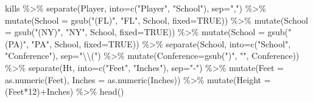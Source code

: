 \documentclass[
]{book}
\newenvironment{Shaded}{\begin{snugshade}}{\end{snugshade}}
\newcommand{\AttributeTok}[1]{\textcolor[rgb]{0.77,0.63,0.00}{#1}}
\newcommand{\ConstantTok}[1]{\textcolor[rgb]{0.00,0.00,0.00}{#1}}
\newcommand{\DecValTok}[1]{\textcolor[rgb]{0.00,0.00,0.81}{#1}}
\newcommand{\FunctionTok}[1]{\textcolor[rgb]{0.00,0.00,0.00}{#1}}
\newcommand{\NormalTok}[1]{#1}
\newcommand{\SpecialCharTok}[1]{\textcolor[rgb]{0.00,0.00,0.00}{#1}}
\newcommand{\StringTok}[1]{\textcolor[rgb]{0.31,0.60,0.02}{#1}}
\begin{document}
\begin{Shaded}
\begin{Highlighting}[]
\NormalTok{kills }\SpecialCharTok{\%\textgreater{}\%} 
  \FunctionTok{separate}\NormalTok{(Player, }\AttributeTok{into=}\FunctionTok{c}\NormalTok{(}\StringTok{"Player"}\NormalTok{, }\StringTok{"School"}\NormalTok{), }\AttributeTok{sep=}\StringTok{","}\NormalTok{) }\SpecialCharTok{\%\textgreater{}\%} 
  \FunctionTok{mutate}\NormalTok{(}\AttributeTok{School =} \FunctionTok{gsub}\NormalTok{(}\StringTok{"(FL)"}\NormalTok{, }\StringTok{"FL"}\NormalTok{, School, }\AttributeTok{fixed=}\ConstantTok{TRUE}\NormalTok{)) }\SpecialCharTok{\%\textgreater{}\%}
  \FunctionTok{mutate}\NormalTok{(}\AttributeTok{School =} \FunctionTok{gsub}\NormalTok{(}\StringTok{"(NY)"}\NormalTok{, }\StringTok{"NY"}\NormalTok{, School, }\AttributeTok{fixed=}\ConstantTok{TRUE}\NormalTok{)) }\SpecialCharTok{\%\textgreater{}\%}
  \FunctionTok{mutate}\NormalTok{(}\AttributeTok{School =} \FunctionTok{gsub}\NormalTok{(}\StringTok{"(PA)"}\NormalTok{, }\StringTok{"PA"}\NormalTok{, School, }\AttributeTok{fixed=}\ConstantTok{TRUE}\NormalTok{)) }\SpecialCharTok{\%\textgreater{}\%}
  \FunctionTok{separate}\NormalTok{(School, }\AttributeTok{into=}\FunctionTok{c}\NormalTok{(}\StringTok{"School"}\NormalTok{, }\StringTok{"Conference"}\NormalTok{), }\AttributeTok{sep=}\StringTok{"}\SpecialCharTok{\textbackslash{}\textbackslash{}}\StringTok{("}\NormalTok{) }\SpecialCharTok{\%\textgreater{}\%} 
  \FunctionTok{mutate}\NormalTok{(}\AttributeTok{Conference=}\FunctionTok{gsub}\NormalTok{(}\StringTok{")"}\NormalTok{, }\StringTok{""}\NormalTok{, Conference)) }\SpecialCharTok{\%\textgreater{}\%}
  \FunctionTok{separate}\NormalTok{(Ht, }\AttributeTok{into=}\FunctionTok{c}\NormalTok{(}\StringTok{"Feet"}\NormalTok{, }\StringTok{"Inches"}\NormalTok{), }\AttributeTok{sep=}\StringTok{"{-}"}\NormalTok{) }\SpecialCharTok{\%\textgreater{}\%}
  \FunctionTok{mutate}\NormalTok{(}\AttributeTok{Feet =} \FunctionTok{as.numeric}\NormalTok{(Feet), }\AttributeTok{Inches =} \FunctionTok{as.numeric}\NormalTok{(Inches)) }\SpecialCharTok{\%\textgreater{}\%}
  \FunctionTok{mutate}\NormalTok{(}\AttributeTok{Height =}\NormalTok{ (Feet}\SpecialCharTok{*}\DecValTok{12}\NormalTok{)}\SpecialCharTok{+}\NormalTok{Inches) }\SpecialCharTok{\%\textgreater{}\%}
  \FunctionTok{head}\NormalTok{()}
\end{Highlighting}
\end{Shaded}
\end{document}

